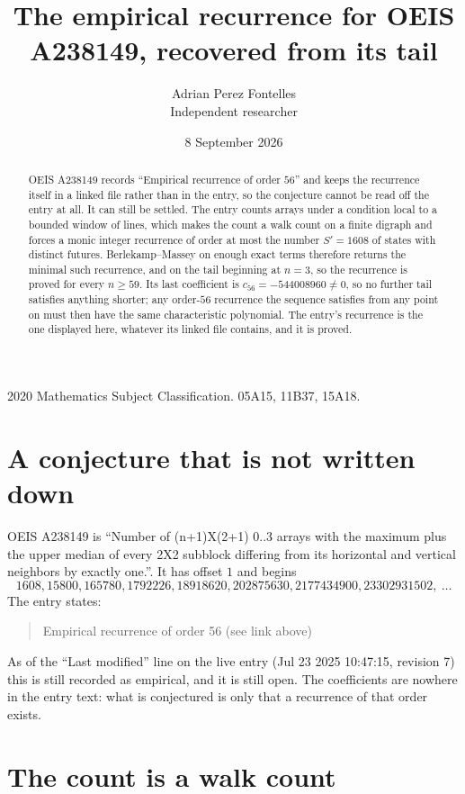 \documentclass[11pt,a4paper]{article}
\title{The empirical recurrence for OEIS A238149, recovered from its tail}
\author{Adrian Perez Fontelles\\ \small Independent researcher}
\date{8 September 2026}
\theoremstyle{plain}
\theoremstyle{definition}
\begin{document}
\maketitle

\begin{abstract}
OEIS A238149 records ``Empirical recurrence of order $56$'' and keeps the recurrence itself in
a linked file rather than in the entry, so the conjecture cannot be read off the entry at all.
It can still be settled. The entry counts arrays under a condition local to a bounded window of
lines, which makes the count a walk count on a finite digraph and forces a monic integer
recurrence of order at most the number $S'=1608$ of states with distinct futures. Berlekamp--Massey on
enough exact terms therefore returns the minimal such recurrence, and on the tail beginning at $n=3$, so the recurrence is proved for every $n\ge59$.
Its last coefficient is $c_{56}=-544008960\neq0$, so no further tail satisfies anything
shorter; any order-$56$ recurrence the sequence satisfies from any point on must then have
the same characteristic polynomial. The entry's recurrence is the one displayed here, whatever
its linked file contains, and it is proved.
\end{abstract}

\noindent\small 2020 Mathematics Subject Classification. 05A15, 11B37, 15A18.\normalsize

\section{A conjecture that is not written down}

OEIS A238149 is ``Number of (n+1)X(2+1) 0..3 arrays with the maximum plus the upper median of every 2X2 subblock differing from its horizontal and vertical neighbors by exactly one.''. It has offset $1$ and begins
\[
1608, 15800, 165780, 1792226, 18918620, 202875630, 2177434900, 23302931502,\ \dots
\]
The entry states:
\begin{quote}
Empirical recurrence of order 56 (see link above)
\end{quote}
As of the ``Last modified'' line on the live entry (Jul 23 2025 10:47:15, revision 7)
this is still recorded as empirical, and it is still open. The coefficients are nowhere in the
entry text: what is conjectured is only that a recurrence of that order exists.

\section{The count is a walk count}
\end{document}
